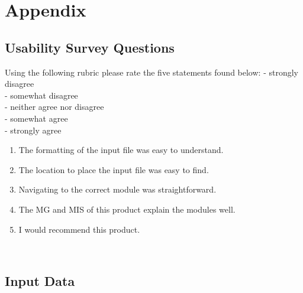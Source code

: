 \documentclass[12pt, titlepage]{article}
\begin{document}
\section{Appendix}


\subsection{Usability Survey Questions} \label{usabilitysurevyquestions}

Using the following rubric please rate the five statements found below:
\linebreak
{} - strongly disagree\\
 - somewhat disagree\\
 - neither agree nor disagree\\
 - somewhat agree\\
 - strongly agree\\

\begin{enumerate}
\item The formatting of the input file was easy to understand.
\item The location to place the input file was easy to find.
\item Navigating to the correct module was straightforward.
\item The MG and MIS of this product explain the modules well.
\item I would recommend this product.
\end{enumerate}


~\newpage
\subsection{Input Data}
\label{inputdata}
\end{document}
